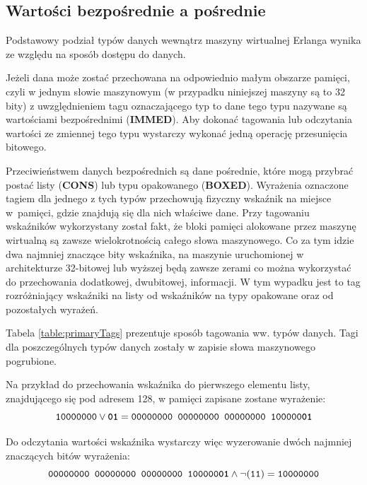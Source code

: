 \subsection{Wartości bezpośrednie a pośrednie}
\label{sub:typyTypy}

Podstawowy podział typów danych wewnątrz maszyny wirtualnej Erlanga wynika ze względu na sposób dostępu do danych. 

Jeżeli dana może zostać przechowana na odpowiednio małym obszarze pamięci, czyli w jednym słowie maszynowym (w przypadku niniejszej maszyny są to 32 bity) z uwzględnieniem tagu oznaczającego typ to dane tego typu nazywane są wartościami bezpośrednimi (\textbf{IMMED}). Aby dokonać tagowania lub odczytania wartości ze zmiennej tego typu wystarczy wykonać jedną operację przesunięcia bitowego.

Przeciwieństwem danych bezpośrednich są dane pośrednie, które mogą przybrać postać listy (\textbf{CONS}) lub typu opakowanego (\textbf{BOXED}).
Wyrażenia oznaczone tagiem dla jednego z tych typów przechowują fizyczny wskaźnik na miejsce w~pamięci, gdzie znajdują się dla nich właściwe dane.
Przy tagowaniu wskaźników wykorzystany został fakt, że bloki pamięci alokowane przez maszynę wirtualną są zawsze wielokrotnością całego słowa maszynowego.
Co za tym idzie dwa najmniej znaczące bity wskaźnika, na maszynie uruchomionej w architekturze 32-bitowej lub wyższej będą zawsze zerami co można wykorzystać do przechowania dodatkowej, dwubitowej, informacji. W tym wypadku jest to tag rozróżniający wskaźniki na listy od wskaźników na typy opakowane oraz od pozostałych wyrażeń.

Tabela \ref{table:primaryTags} prezentuje sposób tagowania ww. typów danych.
Tagi dla poszczególnych typów danych zostały w zapisie słowa maszynowego pogrubione.

Na przykład do przechowania wskaźnika do pierwszego elementu listy, znajdującego się pod adresem 128, w pamięci zapisane zostane wyrażenie:
$$\texttt{10000000} \vee \texttt{\textbf{01}} = \texttt{00000000 00000000 00000000 100000\textbf{01}}$$

Do odczytania wartości wskaźnika wystarczy więc wyzerowanie dwóch najmniej znaczących bitów wyrażenia:
$$\texttt{00000000 00000000 00000000 100000\textbf{01}} \wedge  \lnot(\texttt{11}) = \texttt{10000000}$$ 

